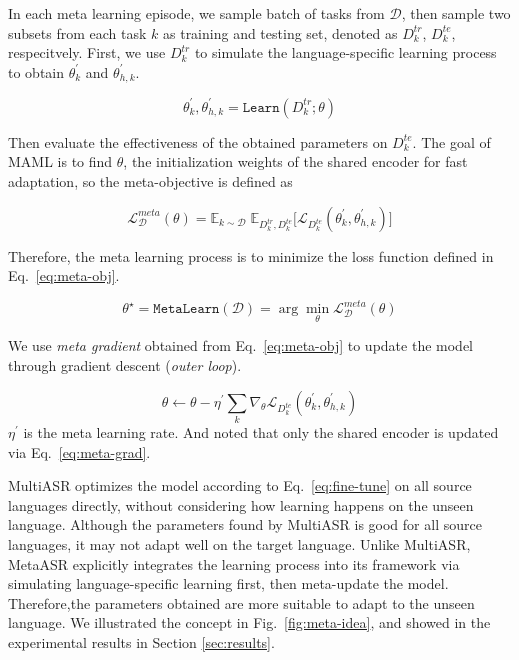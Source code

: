 In each meta learning episode, we sample batch of tasks from $\mathcal{D}$, then sample two subsets from each task $k$ as training and testing set, denoted as $D_{k}^{tr}$, $D_{k}^{te}$, respecitvely. First, we use $D_k^{tr}$ to simulate the language-specific learning process to obtain $\theta^\prime_k$ and $\theta^\prime_{h,k}$.


\begin{equation}
    \theta_k^\prime, \theta_{h,k}^\prime = \texttt{Learn}(D^{tr}_k; \theta)
\end{equation}

Then evaluate the effectiveness of the obtained parameters on $D_k^{te}$. The goal of MAML is to find $\theta$, the initialization weights of the shared encoder for fast adaptation, so the meta-objective is defined as

\begin{equation}
  \label{eq:meta-obj}
  \mathcal{L}^{meta}_{\mathcal{D}}(\theta) =  \mathbb{E}_{k \sim \mathcal{D}} \; \mathbb{E}_{D_k^{tr}, D_k^{te}} \Big [ \mathcal{L}_{D^{te}_k}(\theta^\prime_k, \theta^\prime_{h,k}) \Big ]
\end{equation}

Therefore, the meta learning process is to minimize the loss function defined in Eq.~\ref{eq:meta-obj}.

\begin{equation}
  \theta^\star = \texttt{MetaLearn}(\mathcal{D}) = \arg \min_{\theta} \mathcal{L}^{meta}_{\mathcal{D}} (\theta)
\end{equation}

We use \textit{meta gradient} obtained from Eq.~\ref{eq:meta-obj} to update the model through gradient descent (\textit{outer loop}).

\begin{equation}
  \label{eq:meta-grad}
  \theta \leftarrow \theta - \eta^\prime \sum_k \nabla_\theta \mathcal{L}_{D^{te}_k}(\theta^\prime_k, \theta^\prime_{h,k})
\end{equation}
$\eta^\prime$ is the meta learning rate. And noted that only the shared encoder is updated via Eq.~\ref{eq:meta-grad}.

MultiASR optimizes the model according to Eq.~\ref{eq:fine-tune} on all source languages directly, without considering how learning happens on the unseen language. Although the parameters found by MultiASR is good for all source languages, it may not adapt well on the target language. Unlike MultiASR, MetaASR explicitly integrates the learning process into its framework via simulating language-specific learning first, then meta-update the model. Therefore,the parameters obtained are more suitable to adapt to the unseen language. We illustrated the concept in Fig.~\ref{fig:meta-idea}, and showed in the experimental results in Section \ref{sec:results}.


